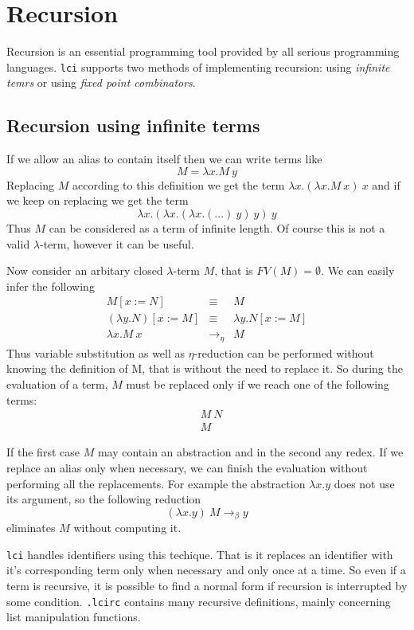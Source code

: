 \documentclass[a4paper,11pt]{article}
\newcommand{\la}{$\lambda$}
\newcommand{\lci}{\texttt{lci}}
\newcommand{\kwd}[1]{\texttt{#1}}
\begin{document}
\section{Recursion}
Recursion is an essential programming tool provided by all serious programming
languages. \lci{} supports two methods of implementing recursion: using
\emph{infinite temrs} or using \emph{fixed point combinators}.

\subsection{Recursion using infinite terms}
\label{par_recinf}
If we allow an alias to contain itself then we can write terms like
\[ M = \lambda x.M\ y \]
Replacing $M$ according to this definition we get the term $\lambda x.(\lambda x.M\ x)\ x$
and if we keep on replacing we get the term
\[ \lambda x.(\lambda x.(\lambda x.(...)\ y)\ y)\ y \]
Thus $M$ can be considered as a term of infinite length. Of course this is not
a valid \la-term, however it can be useful.

Now consider an arbitary closed \la-term $M$, that is $FV(M) = \emptyset$. We
can easily infer the following
\[
	\begin{array}{lcl}
		M[x:=N] & \equiv & M \\
		(\lambda y.N)[x:=M] & \equiv & \lambda y.N[x:=M] \\
		\lambda x.M\ x & \rightarrow_\eta & M
	\end{array}
\]
Thus variable substitution as well as $\eta$-reduction can be performed without
knowing the definition of M, that is without the need to replace it. So during
the evaluation of a term, $M$ must be replaced only if we reach one of the
following terms:
\begin{eqnarray}
	& M\ N \\
	& M
\end{eqnarray}

If the first case $M$ may contain an abstraction and in the second any redex.
If we replace an alias only when necessary, we can finish the evaluation without
performing all the replacements. For example the abstraction $\lambda x.y$ does
not use its argument, so the following reduction
\[ (\lambda x.y)\ M \rightarrow_\beta y \]
eliminates $M$ without computing it.

\lci{} handles identifiers using this techique. That is it replaces an identifier
with it's corresponding term only when necessary and only once at a time. So even
if a term is recursive, it is possible to find a normal form if recursion is
interrupted by some condition. \kwd{.lcirc} contains many recursive definitions,
mainly concerning list manipulation functions.
\end{document}
